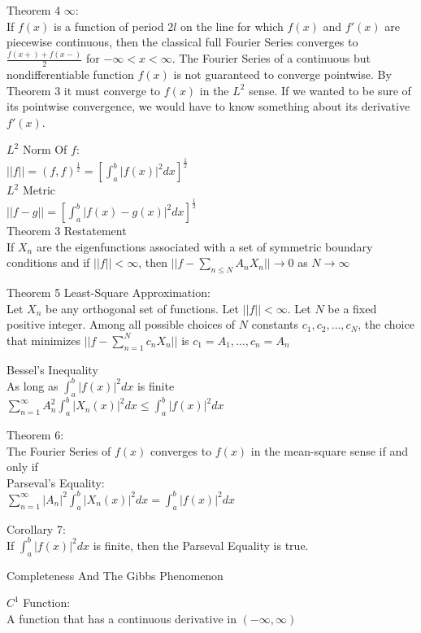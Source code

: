 Theorem 4 $\infty$: \\
If $f(x)$ is a function of period $2l$ on the line for which $f(x)$ and $f'(x)$ are piecewise continuous, then the classical full Fourier Series converges to $\frac{f(x+)+f(x-)}{2}$ for $-\infty < x < \infty$. The Fourier Series of a continuous but nondifferentiable function $f(x)$ is not guaranteed to converge pointwise. By Theorem 3 it must converge to $f(x)$ in the $L^2$ sense. If we wanted to be sure of its pointwise convergence, we would have to know something about its derivative $f'(x)$.

$L^2$ Norm Of $f$: \\
$||f|| = (f,f)^{\frac{1}{2}} = \left[\int_a^b |f(x)|^2 dx \right]^{\frac{1}{2}}$ \\
$L^2$ Metric \\
$||f-g|| = \left[\int_a^b |f(x)-g(x)|^2 dx \right]^{\frac{1}{2}}$ \\
Theorem 3 Restatement \\
If $X_n$ are the eigenfunctions associated with a set of symmetric boundary conditions and if $||f|| < \infty$, then $||f-\sum_{n \le N} A_n X_n|| \to 0$ as $N \to \infty$

Theorem 5 Least-Square Approximation: \\
Let $X_n$ be any orthogonal set of functions. Let $||f|| < \infty$. Let $N$ be a fixed positive integer. Among all possible choices of $N$ constants $c_1,c_2,\dots,c_N$, the choice that minimizes $||f-\sum_{n=1}^{N} c_n X_n||$ is $c_1=A_1,\dots,c_n=A_n$

Bessel's Inequality \\
As long as $\int_a^b |f(x)|^2 dx$ is finite \\
$\sum_{n=1}^{\infty} A_n^2 \int_a^b |X_n (x)|^2 dx \le \int_a^b |f(x)|^2 dx$

Theorem 6: \\
The Fourier Series of $f(x)$ converges to $f(x)$ in the mean-square sense if and only if \\
Parseval's Equality: \\
$\sum_{n=1}^{\infty} |A_n|^2 \int_a^b |X_n (x)|^2 dx = \int_a^b |f(x)|^2 dx$

Corollary 7: \\
If $\int_a^b |f(x)|^2 dx$ is finite, then the Parseval Equality is true.

Completeness And The Gibbs Phenomenon

$C^1$ Function: \\
A function that has a continuous derivative in $(-\infty,\infty)$


